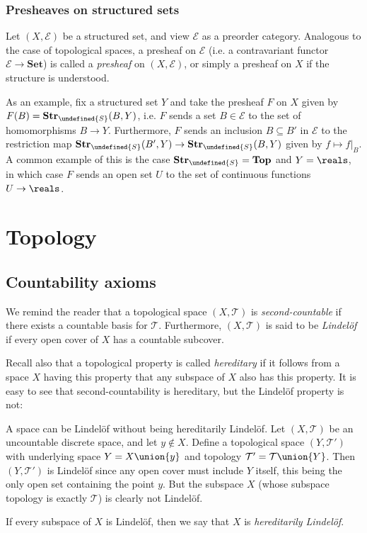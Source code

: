 \documentclass[article, a4paper, 11pt, oneside]{memoir}
\let\mathfrak\undefined
\numberwithin{equation}{chapter}
\newcommand{\calT}{\mathcal{T}}
\newcommand{\calE}{\mathcal{E}}
\newcommand{\strucS}{\mathfrak{S}}
\newcommand{\ncat}[1]{\mathbf{#1}} %
\newcommand{\catSet}{\ncat{Set}} %
\newcommand{\catTop}{\ncat{Top}} %
\newcommand{\catStruc}[1]{\ncat{Str}_{#1}} %
\newcommand{\catStrucS}{\catStruc{\strucS}} %
\begin{document}
\subsection{Presheaves on structured sets}

Let $(X, \calE)$ be a structured set, and view $\calE$ as a preorder category. Analogous to the case of topological spaces, a presheaf on $\calE$ (i.e. a contravariant functor $\calE \to \catSet$) is called a \emph{presheaf} on $(X, \calE)$, or simply a presheaf on $X$ if the structure is understood.

As an example, fix a structured set $Y$ and take the presheaf $F$ on $X$ given by $F(B) = \catStrucS(B,Y)$, i.e. $F$ sends a set $B \in \calE$ to the set of homomorphisms $B \to Y$. Furthermore, $F$ sends an inclusion $B \subseteq B'$ in $\calE$ to the restriction map $\catStrucS(B',Y) \to \catStrucS(B,Y)$ given by $f \mapsto f|_B$. A common example of this is the case $\catStrucS = \catTop$ and $Y = \reals$, in which case $F$ sends an open set $U$ to the set of continuous functions $U \to \reals$.



\chapter{Topology}

\section{Countability axioms}

We remind the reader that a topological space $(X, \calT)$ is \emph{second-countable} if there exists a countable basis for $\calT$. Furthermore, $(X, \calT)$ is said to be \emph{Lindelöf} if every open cover of $X$ has a countable subcover.

Recall also that a topological property is called \emph{hereditary} if it follows from a space $X$ having this property that any subspace of $X$ also has this property. It is easy to see that second-countability is hereditary, but the Lindelöf property is not:

\begin{remark}
    A space can be Lindelöf without being hereditarily Lindelöf. Let $(X, \calT)$ be an uncountable discrete space, and let $y \not\in X$. Define a topological space $(Y, \calT')$ with underlying space $ Y = X \union \{y\}$ and topology $\calT' = \calT \union \{Y\}$. Then $(Y, \calT')$ is Lindelöf since any open cover must include $Y$ itself, this being the only open set containing the point $y$. But the subspace $X$ (whose subspace topology is exactly $\calT$) is clearly not Lindelöf.
\end{remark}
%
If every subspace of $X$ is Lindelöf, then we say that $X$ is \emph{hereditarily Lindelöf}.
\end{document}
